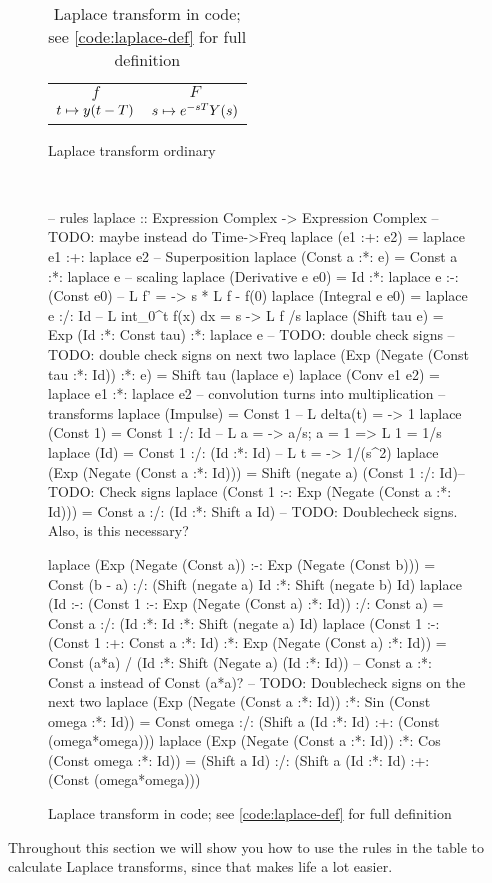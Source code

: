 \begin{table}
    \centering
    \caption{Two tables of the Laplace transform.}
    \label{fig:laplace_tables}
\begin{subfigure}{0.999\textwidth}
    \centering
    \caption{Laplace transform ordinary}
    \label{fig:laplace_table_ord}
    \begin{tabular}{c|c}
    $f$ & $F$ \\
    $t \mapsto y(t - T)$ & $s \mapsto e^{-sT}Y(s)$
    \end{tabular}
\end{subfigure} \\
\begin{subfigure}{0.999\textwidth} 
    \centering
    \caption{Laplace transform in code; see \ref{code:laplace-def} for full definition}
    \label{fig:laplace_table_code}
    \begin{code'}
-- rules
laplace :: Expression Complex -> Expression Complex -- TODO: maybe instead do Time->Freq
laplace (e1 :+: e2) = laplace e1 :+: laplace e2 -- Superposition
laplace (Const a :*: e) = Const a :*: laplace e -- scaling
laplace (Derivative e e0) = Id :*: laplace e :-: (Const e0) -- L {f'} = \s -> s * L {f} - f(0)
laplace (Integral e e0) = laplace e :/: Id -- L {int_0^t f(x) dx} = s -> L {f} /s 
laplace (Shift tau e) = Exp (Id :*: Const tau) :*: laplace e -- TODO: double check signs
  -- TODO: double check signs on next two
laplace (Exp (Negate (Const tau :*: Id)) :*: e) = Shift tau (laplace e)
laplace (Conv e1 e2) = laplace e1 :*: laplace e2 -- convolution turns into multiplication
-- transforms
laplace (Impulse) = Const 1 -- L {delta(t)} = \s -> 1
laplace (Const 1) = Const 1 :/: Id -- L {a} = \s -> a/s; a = 1 => L {1} = 1/s
laplace (Id)      = Const 1 :/: (Id :*: Id) -- L {t} = \s -> 1/(s^2)
laplace (Exp (Negate (Const a :*: Id))) = Shift (negate a) (Const 1 :/: Id)-- TODO: Check signs
laplace (Const 1 :-: Exp (Negate (Const a :*: Id))) = Const a :/: (Id :*: Shift a Id) -- TODO: Doublecheck signs. Also, is this necessary?

laplace (Exp (Negate (Const a)) :-: Exp (Negate (Const b))) = Const (b - a) :/: (Shift (negate a) Id :*: Shift (negate b) Id)
laplace (Id :-: (Const 1 :-: Exp (Negate (Const a) :*: Id)) :/: Const a) = Const a  :/: (Id :*: Id :*: Shift (negate a) Id)
laplace (Const 1 :-: (Const 1 :+: Const a :*: Id) :*: Exp (Negate (Const a) :*: Id)) = Const (a*a) / (Id :*: Shift (Negate a) (Id :*: Id)) -- Const a :*: Const a instead of Const (a*a)?
-- TODO: Doublecheck signs on the next two
laplace (Exp (Negate (Const a :*: Id)) :*: Sin (Const omega :*: Id)) = Const omega :/: (Shift a (Id :*: Id) :+: (Const (omega*omega)))
laplace (Exp (Negate (Const a :*: Id)) :*: Cos (Const omega :*: Id)) = (Shift a Id) :/: (Shift a (Id :*: Id) :+: (Const (omega*omega)))
    \end{code'}
\end{subfigure}
\end{table}
Throughout this section we will show you how to use the rules in the table to
calculate Laplace transforms, since that makes life a lot easier. 


